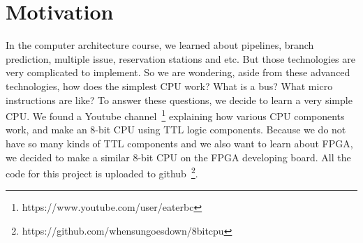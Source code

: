 \section{Motivation}
\label{sec:motivation}
In the computer architecture course, we learned about pipelines, branch prediction, multiple issue, reservation stations and etc. But those technologies are very complicated to implement. So we are wondering, aside from these advanced technologies, how does the simplest CPU work? What is a bus? What micro instructions are like? To answer these questions, we decide to learn a very simple CPU. We found a Youtube channel~\footnote{https://www.youtube.com/user/eaterbc} explaining how various CPU components work, and make an 8-bit CPU using TTL logic components. Because we do not have so many kinds of TTL components and we also want to learn about FPGA, we decided to make a similar 8-bit CPU on the FPGA developing board. All the code for this project is uploaded to github~\footnote{https://github.com/whensungoesdown/8bitcpu}.
